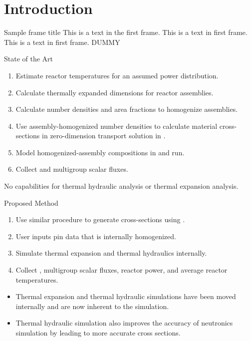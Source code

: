\section{Introduction}
\label{sec:introduction}

\begin{frame}{Sample frame title}
  This is a text in the first frame. This is a text in first frame. This is a
  text in first frame. DUMMY
\end{frame}

\begin{frame}{State of the Art}

  \begin{enumerate}
    \item Estimate reactor temperatures for an assumed power distribution.
    \item Calculate thermally expanded dimensions for reactor assemblies.
    \item Calculate number densities and area fractions to homogenize
      assemblies.
    \item Use assembly-homogenized number densities to calculate material
      cross-sections in zero-dimension transport solution in \mcc.
    \item Model homogenized-assembly compositions in \dif and run.
    \item Collect \keff and multigroup scalar fluxes.
  \end{enumerate}

  \begin{block}{}
    No capabilities for thermal hydraulic analysis or thermal expansion
    analysis.
  \end{block}
\end{frame}

\begin{frame}{Proposed Method}
  \begin{enumerate}
    \item Use similar procedure to generate cross-sections using \mcc.
    \item User inputs pin data that is internally homogenized.
    \item Simulate thermal expansion and thermal hydraulics internally.
    \item Collect \keff, multigroup scalar fluxes, reactor power, and average
      reactor temperatures.
  \end{enumerate}
  \begin{itemize}
    \item Thermal expansion and thermal hydraulic simulations have been moved
      internally and are now inherent to the simulation.
    \item Thermal hydraulic simulation also improves the accuracy of neutronics
      simulation by leading to more accurate cross sections.
  \end{itemize}
\end{frame}

